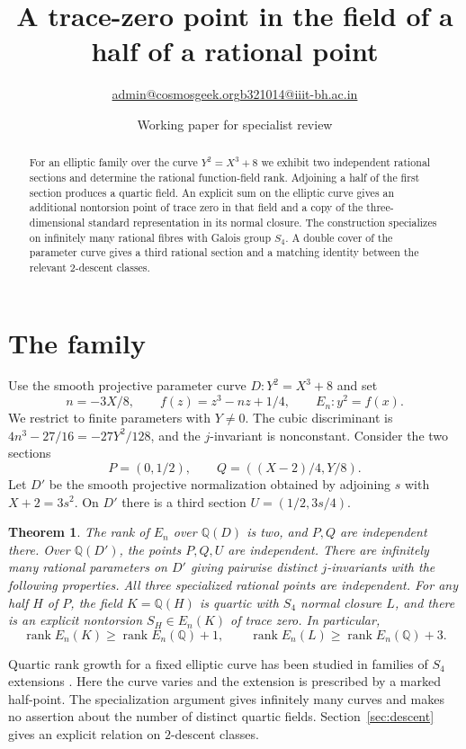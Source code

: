 \documentclass[11pt]{article}
\title{A trace-zero point in the field of a half of a rational point}
\author{\small \href{mailto:admin@cosmosgeek.org}{admin@cosmosgeek.org}\qquad \href{mailto:b321014@iiit-bh.ac.in}{b321014@iiit-bh.ac.in}}
\date{Working paper for specialist review}
\newtheorem{theorem}{Theorem}
\newcommand{\Q}{\mathbb Q}
\newcommand{\rank}{\operatorname{rank}}
\begin{document}
\maketitle
\begin{abstract}
For an elliptic family over the curve $Y^2=X^3+8$ we exhibit two
independent rational sections and determine the rational function-field rank.
Adjoining a half of the first section produces a quartic field. An explicit
sum on the elliptic curve gives an additional nontorsion point of trace
zero in that field and a copy of the three-dimensional standard
representation in its normal closure. The construction specializes on
infinitely many rational fibres with Galois group $S_4$. A double cover of
the parameter curve gives a third rational section and a matching identity
between the relevant $2$-descent classes.
\end{abstract}

\section{The family}

Use the smooth projective parameter curve $D:Y^2=X^3+8$ and set
\[
 n=-3X/8,\qquad f(z)=z^3-nz+1/4,\qquad E_n:y^2=f(x).
\]
We restrict to finite parameters with $Y\ne0$. The cubic discriminant is
$4n^3-27/16=-27Y^2/128$, and the $j$-invariant is nonconstant.
Consider the two sections
\[
 P=(0,1/2),\qquad Q=((X-2)/4,Y/8).
\]
Let $D'$ be the smooth projective normalization obtained by adjoining
$s$ with $X+2=3s^2$. On $D'$ there is a third section $U=(1/2,3s/4)$.

\begin{theorem}\label{th:main}
The rank of $E_n$ over $\Q(D)$ is two, and $P,Q$ are independent there.
Over $\Q(D')$, the points $P,Q,U$ are independent. There are infinitely
many rational parameters on $D'$ giving pairwise distinct $j$-invariants
with the following properties. All three specialized rational points are
independent. For any half $H$ of $P$, the field $K=\Q(H)$ is quartic
with $S_4$ normal closure $L$, and there is an explicit nontorsion
$S_H\in E_n(K)$ of trace zero. In particular,
\[
 \rank E_n(K)\ge\rank E_n(\Q)+1,\qquad
 \rank E_n(L)\ge\rank E_n(\Q)+3.
\]
\end{theorem}

Quartic rank growth for a fixed elliptic curve has been studied in
families of $S_4$ extensions \cite{LOT}. Here the curve varies and the
extension is prescribed by a marked half-point. The specialization
argument gives infinitely many curves and makes no assertion about
the number of distinct quartic fields. Section~\ref{sec:descent}
gives an explicit relation on $2$-descent classes.
\end{document}
